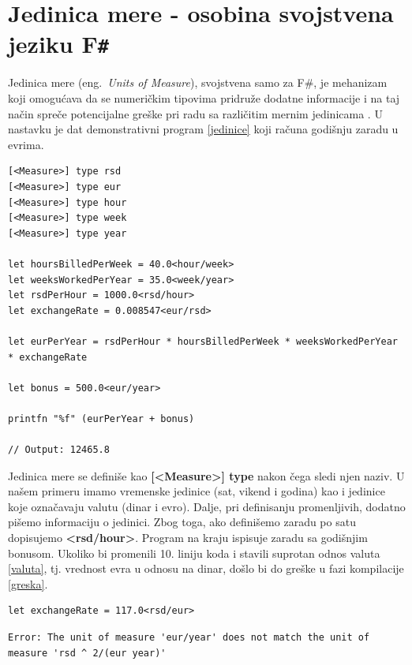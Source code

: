 \documentclass[a4paper]{article}
\begin{document}
\section{Jedinica mere - osobina svojstvena jeziku F\texttt{\#}}
Jedinica mere (eng.~{\em Units of Measure}), svojstvena samo za F\#, je mehanizam koji omogućava da se numeričkim tipovima pridruže dodatne informacije i na taj način spreče potencijalne greške pri radu sa različitim mernim jedinicama \cite{unitsOfMeasure}. U nastavku je dat demonstrativni program \ref{jedinice} koji računa godišnju zaradu u evrima. \\

\begin{lstlisting}[caption={Primer jedinice mere},frame=single, label=jedinice]
[<Measure>] type rsd
[<Measure>] type eur
[<Measure>] type hour
[<Measure>] type week
[<Measure>] type year

let hoursBilledPerWeek = 40.0<hour/week>
let weeksWorkedPerYear = 35.0<week/year>
let rsdPerHour = 1000.0<rsd/hour>
let exchangeRate = 0.008547<eur/rsd>

let eurPerYear = rsdPerHour * hoursBilledPerWeek * weeksWorkedPerYear * exchangeRate

let bonus = 500.0<eur/year>

printfn "%f" (eurPerYear + bonus)

// Output: 12465.8

\end{lstlisting}

Jedinica mere se definiše kao \textbf{[<Measure>] type} nakon čega sledi njen naziv. U našem primeru imamo vremenske jedinice (sat, vikend i godina) kao i jedinice koje označavaju valutu (dinar i evro). Dalje, pri definisanju promenljivih, dodatno pišemo informaciju o jedinici. Zbog toga, ako definišemo zaradu po satu dopisujemo \textbf{<rsd/hour>}. Program na kraju ispisuje zaradu sa godišnjim bonusom. Ukoliko bi promenili 10. liniju koda i stavili suprotan odnos valuta \ref{valuta}, tj. vrednost evra u odnosu na dinar, došlo bi do greške u fazi kompilacije \ref{greska}. \\
 
\begin{lstlisting}[caption={Promenjen odnos valuta},frame=single, firstnumber=10, label = valuta]
let exchangeRate = 117.0<rsd/eur>
\end{lstlisting}
\begin{lstlisting}[caption={Kompajler prepoznaje grešku},frame=single, label=greska]
Error: The unit of measure 'eur/year' does not match the unit of measure 'rsd ^ 2/(eur year)'
\end{lstlisting}
\end{document}

